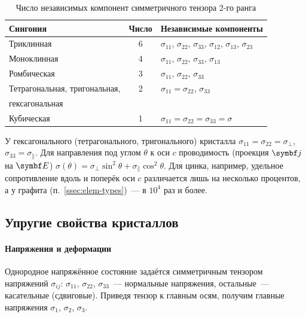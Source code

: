 \begin{table}[ht]
\centering
\caption{Число независимых компонент симметричного тензора 2-го ранга}\label{tab:tensor2}
\small
\begin{tabular}{@{}lcl@{}}
\toprule
Сингония & Число & Независимые компоненты\\
\midrule
Триклинная & 6 & $\sigma_{11}$, $\sigma_{22}$, $\sigma_{33}$, $\sigma_{12}$, $\sigma_{13}$, $\sigma_{23}$\\
Моноклинная & 4 & $\sigma_{11}$, $\sigma_{22}$, $\sigma_{33}$, $\sigma_{13}$\\
Ромбическая & 3 & $\sigma_{11}$, $\sigma_{22}$, $\sigma_{33}$\\
Тетрагональная, тригональная, & 2 & $\sigma_{11}=\sigma_{22}$, $\sigma_{33}$\\
\quad гексагональная & & \\
Кубическая & 1 & $\sigma_{11}=\sigma_{22}=\sigma_{33}=\sigma$\\
\bottomrule
\end{tabular}
\end{table}

\begin{primer}
У гексагонального (тетрагонального, тригонального) кристалла
$\sigma_{11}=\sigma_{22}=\sigma_\perp$, $\sigma_{33}=\sigma_\parallel$. Для направления под
углом $\theta$ к оси $c$ проводимость (проекция $\vb j$ на $\vb E$)
$\sigma(\theta)=\sigma_\perp\sin^2\theta+\sigma_\parallel\cos^2\theta$. Для цинка, например,
удельное сопротивление вдоль и поперёк оси $c$ различается лишь на
несколько процентов, а у графита (п.~\ref{ssec:elem-types})~— в $10^4$ раз и более.
\end{primer}

\subsection{Упругие свойства кристаллов}\label{ssec:elastic-crystals}

\paragraph{Напряжения и деформации}
Однородное напряжённое состояние задаётся симметричным тензором
напряжений $\sigma_{ij}$: $\sigma_{11}$, $\sigma_{22}$, $\sigma_{33}$~— нормальные
напряжения, остальные~— касательные (сдвиговые). Приведя тензор к
главным осям, получим главные напряжения $\sigma_1$, $\sigma_2$, $\sigma_3$.

